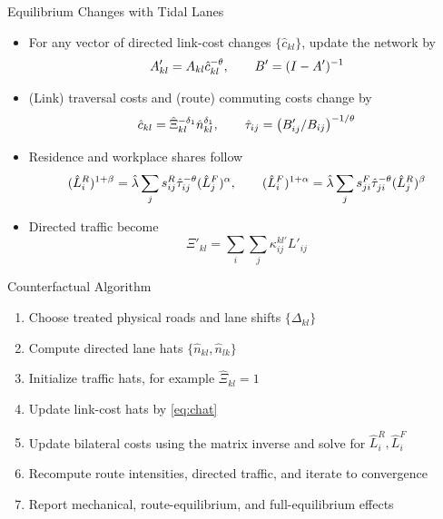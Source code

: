 \documentclass[11pt,aspectratio=169]{beamer}
\begin{document}
\begin{frame}{Equilibrium Changes with Tidal Lanes}
\begin{itemize}
  \item For any vector of directed link-cost changes $\{\hat c_{kl}\}$, update the network by
  \vspace{-1em}\begin{equation}
    A'_{kl}=A_{kl}\hat c_{kl}^{-\theta}, \qquad B'=(I-A')^{-1}
  \vspace{-0.5em}\end{equation}
  \item (Link) traversal costs and (route) commuting costs change by
  \vspace{-0.5em}\begin{equation}\label{eq:chat}
    \hat c_{kl}=\hat\Xi_{kl}^{-\delta_1}\hat n_{kl}^{\delta_1}, \qquad \hat\tau_{ij} = \left( B'_{ij} / B_{ij} \right)^{-1/\theta}
  \vspace{-0.5em}\end{equation}
  \item Residence and workplace shares follow
  \vspace{-0.5em}\begin{equation}
    (\hat L_i^R)^{1+\beta} = \hat\lambda\sum_j s^R_{ij}\hat\tau_{ij}^{-\theta}(\hat L_j^F)^\alpha , \qquad 
(\hat L_i^F)^{1+\alpha} = \hat\lambda\sum_j s^F_{ji}\hat\tau_{ji}^{-\theta}(\hat L_j^R)^\beta
  \vspace{-0.5em}\end{equation}
  \item Directed traffic become
  \vspace{-0.5em}\begin{equation}
    \Xi'_{kl} = \sum_i\sum_j \kappa_{ij}^{kl\prime}L'_{ij}
 \end{equation}
\end{itemize}
\end{frame}

\begin{frame}{Counterfactual Algorithm}
\begin{enumerate}
  \item Choose treated physical roads and lane shifts $\{\Delta_{kl}\}$
  \item Compute directed lane hats $\{\hat n_{kl},\hat n_{lk}\}$
  \item Initialize traffic hats, for example $\hat\Xi_{kl}=1$
  \item Update link-cost hats by \eqref{eq:chat}
  \item Update bilateral costs using the matrix inverse and solve for $\hat L_i^R,\hat L_i^F$
  \item Recompute route intensities, directed traffic, and iterate to convergence
  \item Report mechanical, route-equilibrium, and full-equilibrium effects
\end{enumerate}
\end{frame}
\end{document}
